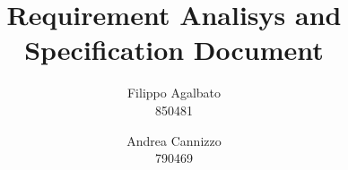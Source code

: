 \documentclass[a4paper]{report}
\begin{document}
\setcounter{tocdepth}{1}

\title{\Huge Requirement Analisys and Specification Document}
\author{Filippo Agalbato \\ 850481 \and Andrea Cannizzo \\ 790469}
\maketitle

\tableofcontents





\appendix

\end{document}
